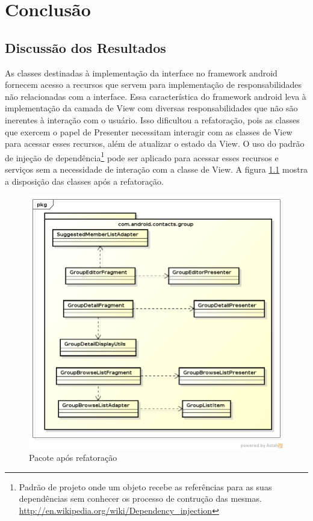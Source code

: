 \chapter{Conclusão} 

\section{Discussão dos Resultados} 

As classes destinadas à implementação da interface no framework android fornecem
acesso a recursos que servem para implementação de responsabilidades não
relacionadas com a interface. Essa característica do framework android leva à
implementação da camada de View com diversas responsabilidades que não são
inerentes à interação com o usuário. Isso dificultou a refatoração, pois as
classes que exercem o papel de Presenter necessitam interagir com as classes de
View para acessar esses recursos, além de atualizar o estado da View. O uso do
padrão de injeção de
dependência\footnote{Padrão
de projeto onde um objeto recebe as referências para as suas dependências sem
conhecer os processo de contrução das mesmas.
\url{http://en.wikipedia.org/wiki/Dependency_injection}}
pode ser aplicado para acessar esses recursos e serviços sem a necessidade de
interação com a classe de View. A figura \ref{fig:classes_iteracao3} mostra a
disposição das classes após a refatoração.


\begin{figure}[htb]
	\label{fig:classes_iteracao3}
	\caption{Pacote após refatoração}
	\begin{center}
		\includegraphics[scale=0.55]{img/classes_iteracao3}
	\end{center}
\end{figure}


